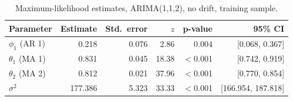 \begin{table}[H]\centering\small
\caption{Maximum-likelihood estimates, ARIMA(1,1,2), no drift, training sample.}\label{tab:params}
\begin{tabular}{lrrrrr}\toprule Parameter & Estimate & Std.\ error & $z$ & p-value & 95\% CI\\\midrule
$\phi_1$ (AR 1) & 0.218 & 0.076 & 2.86 & 0.004 & [0.068, 0.367]\\
$\theta_1$ (MA 1) & 0.831 & 0.045 & 18.38 & $<$0.001 & [0.742, 0.919]\\
$\theta_2$ (MA 2) & 0.812 & 0.021 & 37.96 & $<$0.001 & [0.770, 0.854]\\
$\sigma^2$ & 177.386 & 5.323 & 33.33 & $<$0.001 & [166.954, 187.818]\\
\bottomrule\end{tabular}
\end{table}